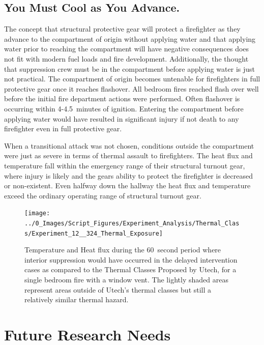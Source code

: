 \documentclass[12pt,oneside]{book}
\begin{document}
\section{You Must Cool as You Advance.} \label{tc:cool_as_you_advance}
The concept that structural protective gear will protect a firefighter as they advance to the compartment of origin without applying water and that applying water prior to reaching the compartment will have negative consequences does not fit with modern fuel loads and fire development. Additionally, the thought that suppression crew must be in the compartment before applying water is just not practical. The compartment of origin becomes untenable for firefighters in full protective gear once it reaches flashover. All bedroom fires reached flash over well before the initial fire department actions were performed. Often flashover is occurring within 4-4.5~minutes of ignition. Entering the compartment before applying water would have resulted in significant injury if not death to any firefighter even in full protective gear.

When a transitional attack was not chosen, conditions outside the compartment were just as severe in terms of thermal assault to firefighters. The heat flux and temperature fall within the emergency range of their structural turnout gear, where injury is likely and the gears ability to protect the firefighter is decreased or non-existent.  Even halfway down the hallway the heat flux and temperature exceed the ordinary operating range of structural turnout gear.

\begin{figure}[H]
\centering
\texttt{[image: ../0\_Images/Script\_Figures/Experiment\_Analysis/Thermal\_Class/Experiment\_12\_\_324\_Thermal\_Exposure]}
\caption[Conditions outside the fire compartment - Single Room with Vent]{Temperature and Heat flux during the 60~second period where interior suppression would have occurred in the delayed intervention cases as compared to the Thermal Classes Proposed by Utech, for a single bedroom fire with a window vent. The lightly shaded areas represent areas outside of Utech's thermal classes but still a relatively similar thermal hazard.}
\label{fig:Thermal_Classes_Approach_Delayed_Suppression_TC}
\end{figure}

\chapter{Future Research Needs}
\end{document}

